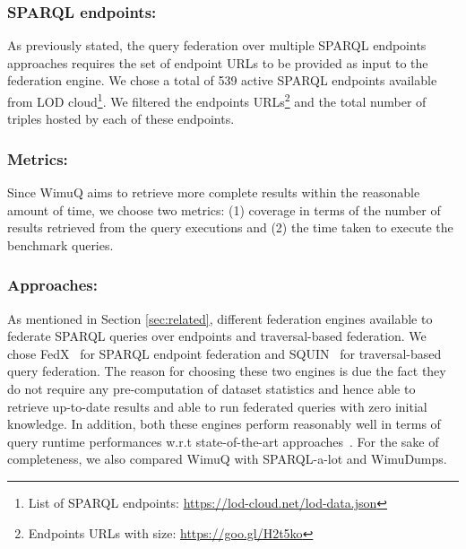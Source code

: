\documentclass[sw]{iosart2x}
\begin{document}
\subsubsection{SPARQL endpoints:} As previously stated, the query federation over multiple SPARQL endpoints approaches requires the set of endpoint URLs to be provided as input to the federation engine. We chose a total of 539 active SPARQL endpoints available from LOD cloud\footnote{List of SPARQL endpoints: \url{https://lod-cloud.net/lod-data.json}}. We filtered the endpoints URLs\footnote{\label{endpoints}Endpoints URLs with size: \url{https://goo.gl/H2t5ko}} and the total number of triples hosted by each of these endpoints. 

\subsubsection{Metrics:} Since WimuQ aims to retrieve more complete results within the reasonable amount of time, we choose two metrics: (1) coverage in terms of the number of results retrieved from the query executions and (2) the time taken to execute the benchmark queries. 

\subsubsection{Approaches:} As mentioned in Section \ref{sec:related}, different federation engines available to federate SPARQL queries over endpoints and traversal-based federation. We chose FedX~\cite{fedx2011} for SPARQL endpoint federation and SQUIN~\cite{hartig2013squin} for traversal-based query federation. The reason for choosing these two engines is due the fact they do not require any pre-computation of dataset statistics and hence able to retrieve up-to-date results and able to run federated queries with zero initial knowledge. In addition, both these engines perform reasonably well in terms of query runtime performances w.r.t state-of-the-art approaches~\cite{saleem2015fine,saleem2018costfed,hartig2013squin}. For the sake of completeness, we also compared WimuQ with SPARQL-a-lot and WimuDumps.  

\end{document}
